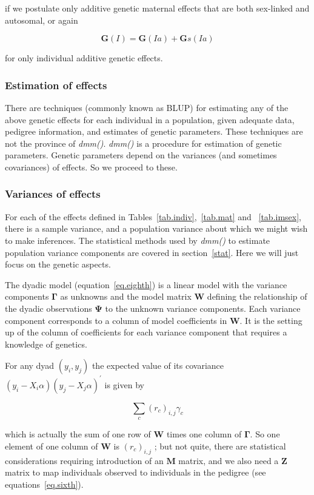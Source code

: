 \documentclass[titlepage]{article}  %
\begin{document}
if we postulate only additive genetic maternal effects that are both sex-linked and autosomal, or again

\begin{displaymath}
{\bm G(I) = \bm G(Ia) + \bm Gs(Ia)}
\end{displaymath}

for only individual additive genetic effects.

\subsubsection{Estimation of effects}
	There are techniques (commonly known as BLUP) for estimating any of the above genetic effects for each individual in a population, given adequate data, pedigree information, and estimates of genetic parameters. These techniques are not the province of {\em dmm()}. {\em dmm()} is a procedure for estimation of genetic parameters. Genetic parameters depend on the variances (and sometimes covariances) of effects. So we proceed to these.


\subsubsection{Variances of effects}
 For each of the effects defined in Tables~\ref{tab.indiv},~\ref{tab.mat} and ~\ref{tab.imsex}, there is a sample variance, and a population variance about which we might wish to make inferences. The statistical methods used by {\em dmm()} to estimate population variance components are covered in section~\ref{stat}. Here we will just focus on the genetic aspects.

 The dyadic model (equation~\ref{eq.eighth}) is a linear model with the variance components ${\bm \Gamma}$ as unknowns and the model matrix ${\bm W}$ defining the relationship of the dyadic observations ${\bm \Psi}$ to the unknown variance components. Each variance component corresponds to a column of model coefficients in ${\bm W}$. It is the setting up of the column of coefficients for each variance component that requires a knowledge of genetics.

 For any dyad $(y_{i},y_{j})$ the expected value of its covariance $(y_{i} - X_{i}\alpha)(y_{j} - X_{j}\alpha)^{\prime}$ is given by

\begin{equation}
\sum_{c}{(r_{c})_{i,j}\gamma_{c}}  \label{eq.covrel}
\end{equation}

which is actually the sum of one row of ${\bm W}$ times one column of ${\bm \Gamma}$. So one element of one column of ${\bm W}$ is $(r_{c})_{i,j}$ ; but not quite, there are statistical considerations requiring introduction of an ${\bm M}$ matrix, and we also need a ${\bm Z}$ matrix to map individuals observed to individuals in the pedigree (see equations~\ref{eq.sixth}).
\end{document}
